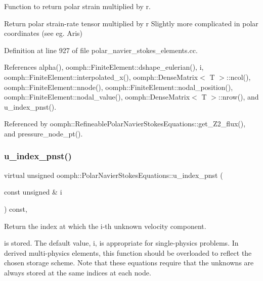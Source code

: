 Function to return polar strain multiplied by r. 

Return polar strain-\/rate tensor multiplied by r Slightly more complicated in polar coordinates (see eg. Aris) 

Definition at line 927 of file polar\+\_\+navier\+\_\+stokes\+\_\+elements.\+cc.



References alpha(), oomph\+::\+Finite\+Element\+::dshape\+\_\+eulerian(), i, oomph\+::\+Finite\+Element\+::interpolated\+\_\+x(), oomph\+::\+Dense\+Matrix$<$ T $>$\+::ncol(), oomph\+::\+Finite\+Element\+::nnode(), oomph\+::\+Finite\+Element\+::nodal\+\_\+position(), oomph\+::\+Finite\+Element\+::nodal\+\_\+value(), oomph\+::\+Dense\+Matrix$<$ T $>$\+::nrow(), and u\+\_\+index\+\_\+pnst().



Referenced by oomph\+::\+Refineable\+Polar\+Navier\+Stokes\+Equations\+::get\+\_\+\+Z2\+\_\+flux(), and pressure\+\_\+node\+\_\+pt().

\mbox{\label{classoomph_1_1PolarNavierStokesEquations_aa478578286aece66720cbd841f450ba0}} 
\subsubsection{\texorpdfstring{u\+\_\+index\+\_\+pnst()}{u\_index\_pnst()}}
{\footnotesize\ttfamily virtual unsigned oomph\+::\+Polar\+Navier\+Stokes\+Equations\+::u\+\_\+index\+\_\+pnst (\begin{DoxyParamCaption}\item[{const unsigned \&}]{i }\end{DoxyParamCaption}) const\hspace{0.3cm}{\ttfamily [inline]}, {\ttfamily [virtual]}}



Return the index at which the i-\/th unknown velocity component. 

is stored. The default value, i, is appropriate for single-\/physics problems. In derived multi-\/physics elements, this function should be overloaded to reflect the chosen storage scheme. Note that these equations require that the unknowns are always stored at the same indices at each node. 

